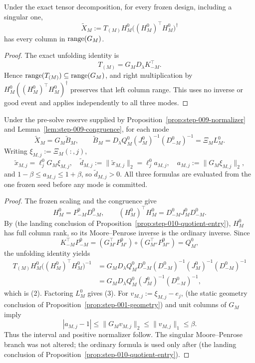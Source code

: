 \begin{lemma}\label{lem:step-010-range}
Under the exact tensor decomposition, for every frozen
design, including a singular one,
\[
\widetilde X_M:=T_{(M)}H_M^0\big((H_M^0)^\top H_M^0\big)^\dagger
\]
has every column in \({\rm range}(G_M)\).

\begin{proof}
The exact unfolding identity is
\[
T_{(M)}=G_MD_\lambda K_{-M}^{\top}. \tag{1}
\]
Hence \({\rm range}(T_{(M)})\subseteq{\rm range}(G_M)\), and right
multiplication by \(H_M^0((H_M^0)^\top H_M^0)^\dagger\) preserves that
left column range.  This uses no inverse or good event and applies
independently to all three modes.


\end{proof}
\end{lemma}
\begin{proposition}\label{prop:step-010-frozen-solves}
Under the pre-solve reserve supplied by Proposition~\ref{prop:step-009-normalizer}
and Lemma~\ref{lem:step-009-congruence}, for each mode
\[
\widetilde X_M=G_M\widetilde B_M,\qquad
\widetilde B_M=D_\lambda Q_M^0(J_M^0)^{-1}(D_{-M}^0)^{-1}
=\Xi_ML_M^0. \tag{2}
\]
Writing \(\xi_{M,j}:=\Xi_M(:,j)\),
\[
\widetilde x_{M,j}=\ell_j^0G_M\xi_{M,j},\quad
\widetilde d_{M,j}:=\|\widetilde x_{M,j}\|_2
=\ell_j^0a_{M,j},\quad a_{M,j}:=\|G_M\xi_{M,j}\|_2, \tag{3}
\]
and \(1-\beta\le a_{M,j}\le1+\beta\), so
\(\widetilde d_{M,j}>0\).  All three formulas are evaluated from the one
frozen seed before any mode is committed.

\begin{proof}
The frozen scaling and the congruence give
\[
H_M^0=P_{-M}^0D_{-M}^0,\qquad
(H_M^0)^\top H_M^0=D_{-M}^0J_M^0D_{-M}^0. \tag{4}
\]
By (the landing conclusion of Proposition~\ref{prop:step-010-quotient-entry}), \(H_M^0\) has full column rank, so its Moore--Penrose inverse is
the ordinary inverse.  Since
\[
K_{-M}^{\top}P_{-M}^0
=(G_{M'}^\top P_{M'}^0)\circ(G_{M''}^\top P_{M''}^0)
=Q_M^0,
\]
the unfolding identity yields
\[
\begin{aligned}
T_{(M)}H_M^0\big((H_M^0)^\top H_M^0\big)^{-1}
&=G_MD_\lambda Q_M^0D_{-M}^0
 (D_{-M}^0)^{-1}(J_M^0)^{-1}(D_{-M}^0)^{-1}\\
&=G_MD_\lambda Q_M^0(J_M^0)^{-1}(D_{-M}^0)^{-1},
\end{aligned}
\]
which is (2).  Factoring \(L_M^0\) gives (3).  For
\(v_{M,j}:=\xi_{M,j}-e_j\), (the static geometry conclusion of Proposition~\ref{prop:step-001-geometry}) and unit columns of \(G_M\) imply
\[
|a_{M,j}-1|\le\|G_Mv_{M,j}\|_2\le\|v_{M,j}\|_1\le\beta. \tag{5}
\]
Thus the interval and positive normalizer follow.  The singular
Moore--Penrose branch was not altered; the ordinary formula is used only
after (the landing conclusion of Proposition~\ref{prop:step-010-quotient-entry}).


\end{proof}
\end{proposition}
